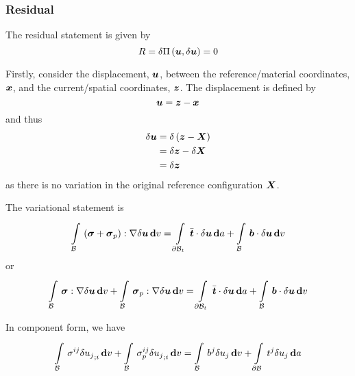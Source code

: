 \subsubsection{Residual}

The residual statement is given by
\begin{equation}
  R=\delta \Pi\left( \boldsymbol{u},\delta\boldsymbol{u} \right) =0
\end{equation}

Firstly, consider the displacement, $\boldsymbol{u}$, between the
reference/material coordinates, $\boldsymbol{x}$, and the current/spatial
coordinates, $\boldsymbol{z}$. The displacement is defined by
\begin{equation}
  \boldsymbol{u}=\boldsymbol{z}-\boldsymbol{x}
\end{equation}
and thus
\begin{equation}
  \begin{split}
    \delta\boldsymbol{u} &=\delta\left( \boldsymbol{z} -\boldsymbol{X} \right) \\
    &=\delta\boldsymbol{z}-\delta\boldsymbol{X} \\
    &=\delta\boldsymbol{z}
  \end{split}
\end{equation}
as there is no variation in the original reference configuration $\boldsymbol{X}$. 

The variational statement  is 
\begin{equation}
  \gint{\embedmanifold{B}}{}{\doubledotprod{\pbrac{\tensor{\sigma}+
        \tensor{\sigma}_{p}}}{\gradient{}{\delta\vectr{u}}}}{v}=
  \gint{\boundary{\embedmanifold{B}}_{t}}{}{\dotprod{\bar{\vectr{t}}}{\delta\vectr{u}}}{a}+
  \gint{\embedmanifold{B}}{}{\dotprod{\vectr{b}}{\delta\vectr{u}}}{v}
\end{equation}
or
\begin{equation}
  \gint{\embedmanifold{B}}{}{\doubledotprod{\tensor{\sigma}}{\gradient{}{\delta\vectr{u}}}}{v}+
  \gint{\embedmanifold{B}}{}{\doubledotprod{\tensor{\sigma}_{p}}{\gradient{}{\delta\vectr{u}}}}{v}=
  \gint{\boundary{\embedmanifold{B}}_{t}}{}{\dotprod{\bar{\vectr{t}}}{\delta\vectr{u}}}{a}+
  \gint{\embedmanifold{B}}{}{\dotprod{\vectr{b}}{\delta\vectr{u}}}{v}
\end{equation}

In component form, we have
\begin{equation}
    \displaystyle\int\limits_{ \mathcal{B} }^{} \,\sigma^{ij} {\delta u_{j}}_{;i} \, \boldsymbol{\mathrm{d}}  v +
    \displaystyle\int\limits_{ \mathcal{B} }^{} \,\sigma^{ij}_{p} {\delta u_{j}}_{;i} \, \boldsymbol{\mathrm{d}}  v =
    \displaystyle\int\limits_{ \mathcal{B} }^{} \,b^{j}\delta u_{j}\, \boldsymbol{\mathrm{d}}  v +
    \displaystyle\int\limits_{ \partial{\ensuremath{ \mathcal{B} }} }^{} \,t^{j}\delta u_{j}\, \boldsymbol{\mathrm{d}}  a 
\end{equation}

